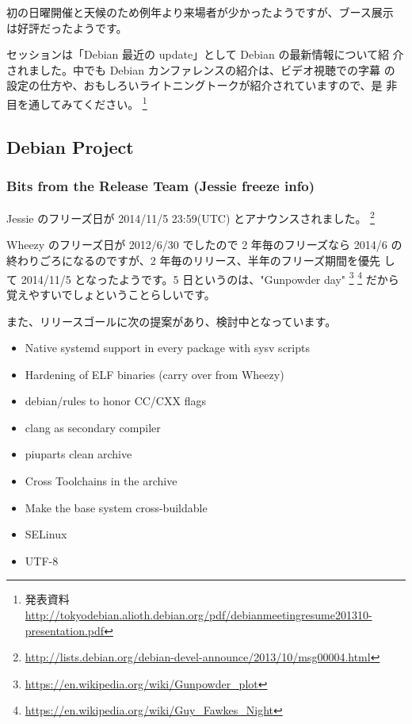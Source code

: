 \documentclass[mingoth,a4paper]{jsarticle}
\begin{document}
初の日曜開催と天候のため例年より来場者が少かったようですが、ブース展示
は好評だったようです。

セッションは「Debian 最近の update」として Debian の最新情報について紹
介されました。中でも Debian カンファレンスの紹介は、ビデオ視聴での字幕
の設定の仕方や、おもしろいライトニングトークが紹介されていますので、是
非目を通してみてください。
\footnote{発表資料 \url{http://tokyodebian.alioth.debian.org/pdf/debianmeetingresume201310-presentation.pdf}}

\subsection{Debian Project}

\subsubsection{Bits from the Release Team (Jessie freeze info)}

Jessie のフリーズ日が 2014/11/5 23:59(UTC) とアナウンスされました。
\footnote{\url{http://lists.debian.org/debian-devel-announce/2013/10/msg00004.html}}

Wheezy のフリーズ日が 2012/6/30 でしたので 2 年毎のフリーズなら 2014/6
の終わりごろになるのですが、2 年毎のリリース、半年のフリーズ期間を優先
して 2014/11/5 となったようです。5 日というのは、"Gunpowder day"
\footnote{\url{https://en.wikipedia.org/wiki/Gunpowder_plot}}
\footnote{\url{https://en.wikipedia.org/wiki/Guy_Fawkes_Night}}
だから覚えやすいでしょということらしいです。

\newpage

また、リリースゴールに次の提案があり、検討中となっています。

\begin{screen}
  \begin{itemize}
  \item Native systemd support in every package with sysv scripts
  \item Hardening of ELF binaries (carry over from Wheezy)
  \item debian/rules to honor CC/CXX flags
  \item clang as secondary compiler
  \item piuparts clean archive
  \item Cross Toolchains in the archive
  \item Make the base system cross-buildable
  \item SELinux
  \item UTF-8
  \end{itemize}
\end{screen}
\end{document}

